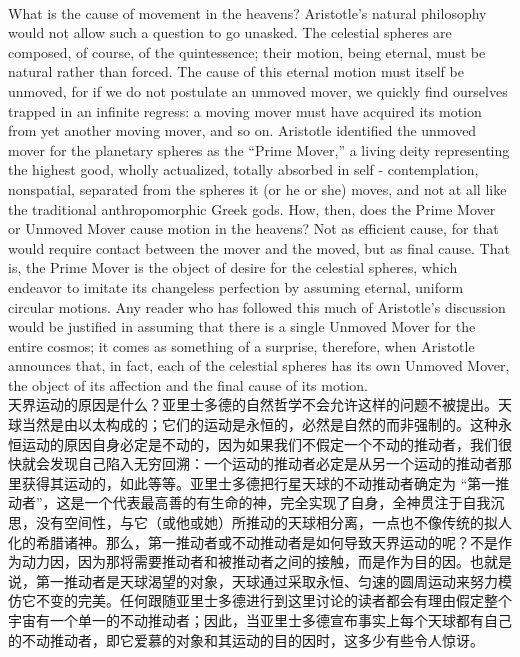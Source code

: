 \documentclass{article}
\begin{document}
\\
What is the cause of movement in the heavens? Aristotle’s natural philosophy would not allow such a question to go unasked. The celestial spheres are composed, of course, of the quintessence; their motion, being eternal, must be natural rather than forced. The cause of this eternal motion must itself be unmoved, for if we do not postulate an unmoved mover, we quickly find ourselves trapped in an infinite regress: a moving mover must have acquired its motion from yet another moving mover, and so on. Aristotle identified the unmoved mover for the planetary spheres as the “Prime Mover,” a living deity representing the highest good, wholly actualized, totally absorbed in self - contemplation, nonspatial, separated from the spheres it (or he or she) moves, and not at all like the traditional anthropomorphic Greek gods. How, then, does the Prime Mover or Unmoved Mover cause motion in the heavens? Not as efficient cause, for that would require contact between the mover and the moved, but as final cause. That is, the Prime Mover is the object of desire for the celestial spheres, which endeavor to imitate its changeless perfection by assuming eternal, uniform circular motions. Any reader who has followed this much of Aristotle’s discussion would be justified in assuming that there is a single Unmoved Mover for the entire cosmos; it comes as something of a surprise, therefore, when Aristotle announces that, in fact, each of the celestial spheres has its own Unmoved Mover, the object of its affection and the final cause of its motion.\\
天界运动的原因是什么？亚里士多德的自然哲学不会允许这样的问题不被提出。天球当然是由以太构成的；它们的运动是永恒的，必然是自然的而非强制的。这种永恒运动的原因自身必定是不动的，因为如果我们不假定一个不动的推动者，我们很快就会发现自己陷入无穷回溯：一个运动的推动者必定是从另一个运动的推动者那里获得其运动的，如此等等。亚里士多德把行星天球的不动推动者确定为 “第一推动者”，这是一个代表最高善的有生命的神，完全实现了自身，全神贯注于自我沉思，没有空间性，与它（或他或她）所推动的天球相分离，一点也不像传统的拟人化的希腊诸神。那么，第一推动者或不动推动者是如何导致天界运动的呢？不是作为动力因，因为那将需要推动者和被推动者之间的接触，而是作为目的因。也就是说，第一推动者是天球渴望的对象，天球通过采取永恒、匀速的圆周运动来努力模仿它不变的完美。任何跟随亚里士多德进行到这里讨论的读者都会有理由假定整个宇宙有一个单一的不动推动者；因此，当亚里士多德宣布事实上每个天球都有自己的不动推动者，即它爱慕的对象和其运动的目的因时，这多少有些令人惊讶。\\
\end{document}
